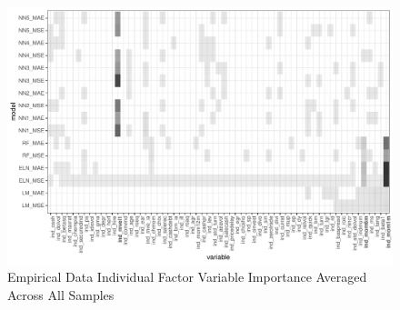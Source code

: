 \documentclass[11pt, a4paper, table]{article}
\begin{document}
\newpage

\begin{figure}
	\begin{center}
	\includegraphics{empirical_sample_all_vi_ind.pdf}
	\end{center}
	\caption{Empirical Data Individual Factor Variable Importance Averaged Across All Samples}
\end{figure}
\end{document}
